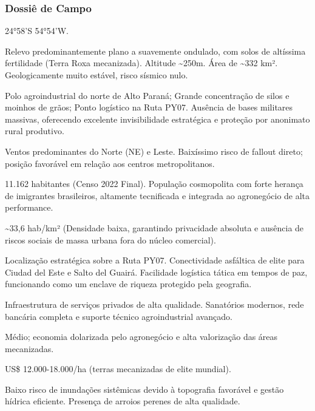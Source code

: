\subsubsection{Dossiê de Campo}
\begin{description}[style=nextline,leftmargin=0.5cm,font=\bfseries]
\item[Coordenadas]  24°58'S 54°54'W.
\item[Topografia]  Relevo predominantemente plano a suavemente ondulado, com solos de altíssima fertilidade (Terra Roxa mecanizada). Altitude \textasciitilde 250m. Área de \textasciitilde 332 km². Geologicamente muito estável, risco sísmico nulo.
\item[Alvos Estratégicos]  Polo agroindustrial do norte de Alto Paraná; Grande concentração de silos e moinhos de grãos; Ponto logístico na Ruta PY07. Ausência de bases militares massivas, oferecendo excelente invisibilidade estratégica e proteção por anonimato rural produtivo.
\item[Fallout]  Ventos predominantes do Norte (NE) e Leste. Baixíssimo risco de fallout direto; posição favorável em relação aos centros metropolitanos.
\item[População]  11.162 habitantes (Censo 2022 Final). População cosmopolita com forte herança de imigrantes brasileiros, altamente tecnificada e integrada ao agronegócio de alta performance.
\item[Densidade]  \textasciitilde 33,6 hab/\allowbreak km² (Densidade baixa, garantindo privacidade absoluta e ausência de riscos sociais de massa urbana fora do núcleo comercial).
\item[Vias de Acesso]  Localização estratégica sobre a Ruta PY07. Conectividade asfáltica de elite para Ciudad del Este e Salto del Guairá. Facilidade logística tática em tempos de paz, funcionando como um enclave de riqueza protegido pela geografia.
\item[Serviços]  Infraestrutura de serviços privados de alta qualidade. Sanatórios modernos, rede bancária completa e suporte técnico agroindustrial avançado.
\item[Custo de Vida]  Médio; economia dolarizada pelo agronegócio e alta valorização das áreas mecanizadas.
\item[Preço da Terra]  US\$ 12.000-18.000/\allowbreak ha (terras mecanizadas de elite mundial).
\item[Hidrologia]  Baixo risco de inundações sistêmicas devido à topografia favorável e gestão hídrica eficiente. Presença de arroios perenes de alta qualidade.

\end{description}
